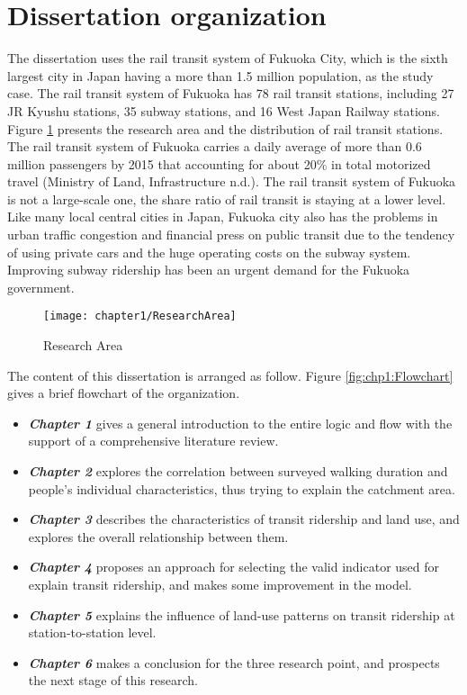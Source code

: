 %
\section{Dissertation organization}
The dissertation uses the rail transit system of Fukuoka City, which is the sixth largest city in Japan having a more than 1.5 million population, as the study case. The rail transit system of Fukuoka has 78 rail transit stations, including 27 JR Kyushu stations, 35 subway stations, and 16 West Japan Railway stations. Figure \ref{fig:chp1:ResearchArea} presents the research area and the distribution of rail transit stations. The rail transit system of Fukuoka carries a daily average of more than 0.6 million passengers by 2015 that accounting for about 20\% in total motorized travel (Ministry of Land, Infrastructure n.d.). The rail transit system of Fukuoka is not a large-scale one, the share ratio of rail transit is staying at a lower level. Like many local central cities in Japan, Fukuoka city also has the problems in urban traffic congestion and financial press on public transit due to the tendency of using private cars and the huge operating costs on the subway system. Improving subway ridership has been an urgent demand for the Fukuoka government.

\begin{figure}[htbp]
	\centering
	\texttt{[image: chapter1/ResearchArea]}
	\caption{Research Area}
	\label{fig:chp1:ResearchArea}
\end{figure}

The content of this dissertation is arranged as follow. Figure \ref{fig:chp1:Flowchart} gives a brief flowchart of the organization.

\begin{itemize}
	\item \emph{\textbf{Chapter 1}} gives a general introduction to the entire logic and flow with the support of a comprehensive literature review.
	\item \emph{\textbf{Chapter 2}} explores the correlation between surveyed walking duration and people's individual characteristics, thus trying to explain the catchment area.
	\item \emph{\textbf{Chapter 3}} describes the characteristics of transit ridership and land use, and explores the overall relationship between them.
	\item \emph{\textbf{Chapter 4}} proposes an approach for selecting the valid indicator used for explain transit ridership, and makes some improvement in the model.
	\item \emph{\textbf{Chapter 5}} explains the influence of land-use patterns on transit ridership at station-to-station level.
	\item \emph{\textbf{Chapter 6}} makes a conclusion for the three research point, and prospects the next stage of this research.
\end{itemize}

